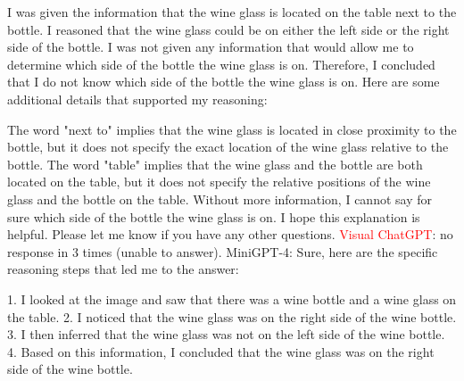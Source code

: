 \begin{enumerate}
        I was given the information that the wine glass is located on the table next to the bottle.
        I reasoned that the wine glass could be on either the left side or the right side of the bottle.
        I was not given any information that would allow me to determine which side of the bottle the wine glass is on.
        Therefore, I concluded that I do not know which side of the bottle the wine glass is on.
        Here are some additional details that supported my reasoning:
        
        The word "next to" implies that the wine glass is located in close proximity to the bottle, but it does not specify the exact location of the wine glass relative to the bottle.
        The word "table" implies that the wine glass and the bottle are both located on the table, but it does not specify the relative positions of the wine glass and the bottle on the table.
        Without more information, I cannot say for sure which side of the bottle the wine glass is on.
        I hope this explanation is helpful. Please let me know if you have any other questions.
        \subitem \textcolor{red}{Visual ChatGPT}: no response in 3 times (unable to answer).
        \subitem MiniGPT-4: Sure, here are the specific reasoning steps that led me to the answer:

        1. I looked at the image and saw that there was a wine bottle and a wine glass on the table.
        2. I noticed that the wine glass was on the right side of the wine bottle.
        3. I then inferred that the wine glass was not on the left side of the wine bottle.
        4. Based on this information, I concluded that the wine glass was on the right side of the wine bottle.
    \end{enumerate}
